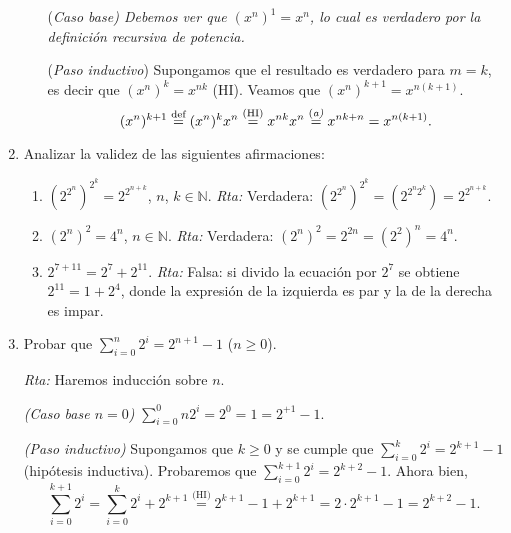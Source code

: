 \documentclass[a4paper,12pt,twoside,spanish,reqno]{amsbook}
\numberwithin{equation}{section}
\newcommand{\rta}{\noindent\textit{Rta: }}
\begin{document}
\begin{enumerate}
\begin{enumerate}
                \noindent(\it Caso  base\rm) Debemos ver que $(x^n)^1 = x^n$, lo cual es verdadero por la definición recursiva de potencia. 
                
                \noindent ({\it Paso  inductivo}) Supongamos que el resultado es verdadero para $m=k$, es decir que  $(x^n)^k = x^{nk}$ (HI). Veamos que  $(x^n)^{k+1} = x^{n(k+1)}$. 
                \begin{equation*}
                (x^n)^{k+1}  \overset{\text{def}}{=} (x^n)^{k}x^n
                \overset{\text{(HI)}}{=} x^{nk}x^n
                \overset{\text{(\textit{a)}}}{=} x^{nk+n} 
                = x^{n(k+1)}.  
                \end{equation*} 
            \end{enumerate}
        

        \item Analizar la validez de las siguientes afirmaciones:
        \begin{enumerate}
            \item  $(2^{2^n})^{2^k} = 2^{2^{n+k}}$,  $n$, $k \in {\mathbb N}$.     \rta  Verdadera: $(2^{2^n})^{2^k} =(2^{2^n2^k}) =  2^{2^{n+k}}$.
            \item $(2^n)^2 = 4^n$, $n \in {\mathbb N}$. \rta  Verdadera: $(2^n)^2 = 2^{2n} =(2^2)^n= 4^n$.
            \item $2^{7+11} = 2^7 + 2^{11}$.  \rta  Falsa: si divido la ecuación por $2^7$ se obtiene $2^{11} = 1 + 2^{4}$,  donde la expresión de la izquierda es par y la de la derecha es impar. 
        \end{enumerate}
        
        
        
        \item\label{ej-suma-2-ala-n} Probar que $\sum_{i=0}^n 2^i = 2^{n+1} -1$ ($n \ge 0$). 
        
        \rta Haremos inducción sobre $n$. 
        
        \textit{(Caso base $n=0$) }  $\sum_{i=0}^0n 2^i = 2^0 = 1 = 2^{+1} -1$.
        
        \textit{(Paso inductivo) } Supongamos que $k\ge 0$ y se cumple que  $\sum_{i=0}^k 2^i = 2^{k+1} -1$ (hipótesis inductiva). Probaremos que  $\sum_{i=0}^{k+1} 2^i = 2^{k+2} -1$. Ahora bien, 
        \begin{equation*}
        \sum_{i=0}^{k+1} 2^i = \sum_{i=0}^{k} 2^i + 2^{k+1} \overset{\text{(HI)}}{=}  2^{k+1} -1 + 2^{k+1} = 2 \cdot 2^{k+1} -1 = 2^{k+2} -1.
        \end{equation*}


\end{enumerate}
\end{document}
